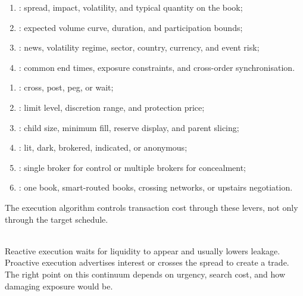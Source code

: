 \begin{taxonomy} 
\begin{enumerate}[label=\roman*.]
\setlength{\itemsep}{0pt}
\item {}: spread, impact, volatility, and typical quantity on the book;
\item {}: expected volume curve, duration, and participation bounds;
\item {}: news, volatility regime, sector, country, currency, and event risk;
\item {}: common end times, exposure constraints, and cross-order synchronisation.
\end{enumerate}
\end{taxonomy}

\begin{taxonomy} 
\begin{enumerate}[label=\roman*.]
\setlength{\itemsep}{0pt}
\item {}: cross, post, peg, or wait;
\item {}: limit level, discretion range, and protection price;
\item {}: child size, minimum fill, reserve display, and parent slicing;
\item {}: lit, dark, brokered, indicated, or anonymous;
\item {}: single broker for control or multiple brokers for concealment;
\item {}: one book, smart-routed books, crossing networks, or upstairs negotiation.
\end{enumerate}
The execution algorithm controls transaction cost through these levers, not only through the target schedule.
\end{taxonomy}

\begin{principle} \\
Reactive execution waits for liquidity to appear and usually lowers leakage. Proactive execution advertises interest or crosses the spread to create a trade. The right point on this continuum depends on urgency, search cost, and how damaging exposure would be.
\end{principle}

